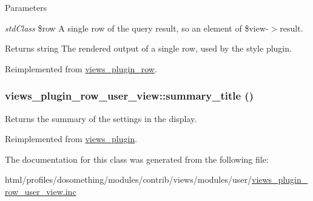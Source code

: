 \begin{DoxyParams}{Parameters}
\item[{\em stdClass}]\$row A single row of the query result, so an element of \$view-\/$>$result.\end{DoxyParams}
\begin{DoxyReturn}{Returns}
string The rendered output of a single row, used by the style plugin. 
\end{DoxyReturn}


Reimplemented from \hyperlink{classviews__plugin__row_a8243842e087dd28664b32cef0309f2a6}{views\_\-plugin\_\-row}.\hypertarget{classviews__plugin__row__user__view_acc71621b782e383515aea48f1f0d8d9a}{
\subsubsection[{summary\_\-title}]{\setlength{\rightskip}{0pt plus 5cm}views\_\-plugin\_\-row\_\-user\_\-view::summary\_\-title ()}}
\label{classviews__plugin__row__user__view_acc71621b782e383515aea48f1f0d8d9a}
Returns the summary of the settings in the display. 

Reimplemented from \hyperlink{classviews__plugin_a9a4aaece48a7cf465dd95d59a3bc5ea1}{views\_\-plugin}.

The documentation for this class was generated from the following file:\begin{DoxyCompactItemize}
\item 
html/profiles/dosomething/modules/contrib/views/modules/user/\hyperlink{views__plugin__row__user__view_8inc}{views\_\-plugin\_\-row\_\-user\_\-view.inc}\end{DoxyCompactItemize}
